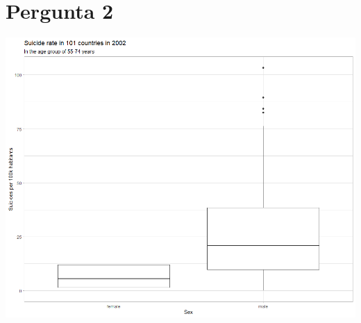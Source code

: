 \documentclass[11pt,a4paper]{article}
\begin{document}
\pagestyle{fancy}

\section*{Pergunta 2}



\vspace{20pt}

\begin{center}
  \includegraphics[width=\linewidth]{pergunta_2.png}
\end{center}
\end{document}
